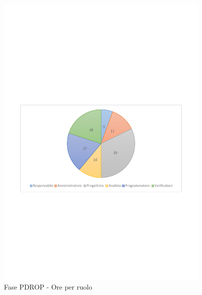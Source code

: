 \documentclass[../PianoProgetto.tex]{subfiles}
\begin{document}
	\begin{figure}[!h]
		\centering
		\includegraphics[width=0.93\textwidth , trim=2cm 9.5cm 2cm 11cm]{grafici/PDROP/PDROP-ore-ruolo}
			\caption{Fase PDROP - Ore per ruolo}
		\label{fig:CircleChart-fasePDRD_ore_r}
	\end{figure}
\vfill
\end{document}
